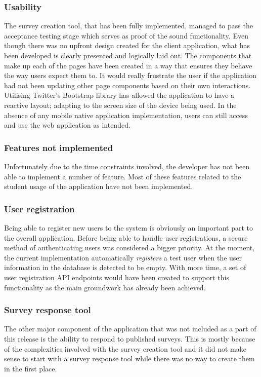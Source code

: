 \subsubsection*{Usability}
The survey creation tool, that has been fully implemented, managed to pass the acceptance testing stage which serves as proof of 
the sound functionality.
Even though there was no upfront design created for the client application, what has been developed is clearly presented and logically laid
out.
The components that make up each of the pages have been created in a way that ensures they behave the way users expect them to.
It would really frustrate the user if the application had not been updating other page components based on their own interactions.
Utilising Twitter's Bootstrap library has allowed the application to have a reactive layout; adapting to the screen size of the device being used.
In the absence of any mobile native application implementation, users can still access and use the web application as intended.

\subsubsection{Features not implemented}
Unfortunately due to the time constraints involved, the developer has not been able to implement a number of feature.
Most of these features related to the student usage of the application have not been implemented.

\subsubsection*{User registration}
Being able to register new users to the system is obviously an important part to the overall application. 
Before being able to handle user registrations, a secure method of authenticating users was considered a bigger priority.  
At the moment, the current implementation automatically \emph{registers} a test user when the user information in the database is detected to be 
empty.
With more time, a set of user registration API endpoints would have been created to support this functionality as the main groundwork has already 
been achieved.

\subsubsection*{Survey response tool}
The other major component of the application that was not included as a part of this release is the ability to respond to published surveys.
This is mostly because of the complexities involved with the survey creation tool and it did not make sense to start with a survey response tool
while there was no way to create them in the first place.

